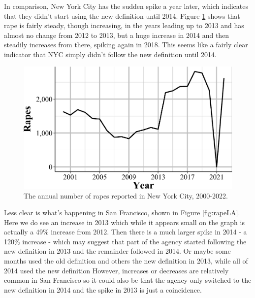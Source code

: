 \documentclass[
  12pt,
  openany]{book}
\begin{document}
In comparison, New York City has the sudden spike a year later, which indicates that they didn't start using the new definition until 2014. Figure \ref{fig:rapeNYC} shows that rape is fairly steady, though increasing, in the years leading up to 2013 and has almost no change from 2012 to 2013, but a huge increase in 2014 and then steadily increases from there, spiking again in 2018. This seems like a fairly clear indicator that NYC simply didn't follow the new definition until 2014.

\begin{figure}

{\centering \includegraphics[width=0.9\linewidth]{03_offenses_known_files/figure-latex/rapeNYC-1} 

}

\caption{The annual number of rapes reported in New York City, 2000-2022.}\label{fig:rapeNYC}
\end{figure}

Less clear is what's happening in San Francisco, shown in Figure \ref{fig:rapeLA}. Here we do see an increase in 2013 which while it appears small on the graph is actually a 49\% increase from 2012. Then there is a much larger spike in 2014 - a 120\% increase - which may suggest that part of the agency started following the new definition in 2013 and the remainder followed in 2014. Or maybe some months used the old definition and others the new definition in 2013, while all of 2014 used the new definition However, increases or decreases are relatively common in San Francisco so it could also be that the agency only switched to the new definition in 2014 and the spike in 2013 is just a coincidence.
\end{document}
